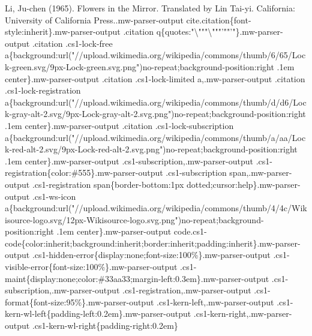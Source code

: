 Li, Ju-chen (1965). Flowers in the Mirror. Translated by Lin Tai-yi.
California: University of California Press..mw-parser-output
cite.citation\{font-style:inherit\}.mw-parser-output .citation
q\{quotes:"\textbackslash{}"""\textbackslash{}"""'""'"\}.mw-parser-output
.citation .cs1-lock-free
a\{background:url("//upload.wikimedia.org/wikipedia/commons/thumb/6/65/Lock-green.svg/9px-Lock-green.svg.png")no-repeat;background-position:right
.1em center\}.mw-parser-output .citation .cs1-lock-limited
a,.mw-parser-output .citation .cs1-lock-registration
a\{background:url("//upload.wikimedia.org/wikipedia/commons/thumb/d/d6/Lock-gray-alt-2.svg/9px-Lock-gray-alt-2.svg.png")no-repeat;background-position:right
.1em center\}.mw-parser-output .citation .cs1-lock-subscription
a\{background:url("//upload.wikimedia.org/wikipedia/commons/thumb/a/aa/Lock-red-alt-2.svg/9px-Lock-red-alt-2.svg.png")no-repeat;background-position:right
.1em center\}.mw-parser-output .cs1-subscription,.mw-parser-output
.cs1-registration\{color:\#555\}.mw-parser-output .cs1-subscription
span,.mw-parser-output .cs1-registration span\{border-bottom:1px
dotted;cursor:help\}.mw-parser-output .cs1-ws-icon
a\{background:url("//upload.wikimedia.org/wikipedia/commons/thumb/4/4c/Wikisource-logo.svg/12px-Wikisource-logo.svg.png")no-repeat;background-position:right
.1em center\}.mw-parser-output
code.cs1-code\{color:inherit;background:inherit;border:inherit;padding:inherit\}.mw-parser-output
.cs1-hidden-error\{display:none;font-size:100\%\}.mw-parser-output
.cs1-visible-error\{font-size:100\%\}.mw-parser-output
.cs1-maint\{display:none;color:\#33aa33;margin-left:0.3em\}.mw-parser-output
.cs1-subscription,.mw-parser-output .cs1-registration,.mw-parser-output
.cs1-format\{font-size:95\%\}.mw-parser-output
.cs1-kern-left,.mw-parser-output
.cs1-kern-wl-left\{padding-left:0.2em\}.mw-parser-output
.cs1-kern-right,.mw-parser-output
.cs1-kern-wl-right\{padding-right:0.2em\}
